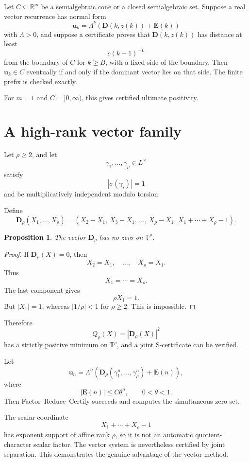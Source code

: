 \documentclass[11pt]{article}
\newtheorem{proposition}[theorem]{Proposition}
\newcommand{\T}{\mathbb T}
\newcommand{\R}{\mathbb R}
\begin{document}
Let \(C\subseteq\R^m\) be a semialgebraic cone or a closed semialgebraic set. Suppose a real vector recurrence has normal form
\[
\mathbf u_k=\Lambda^k(\mathbf D(k,z(k))+\mathbf E(k))
\]
with \(\Lambda>0\), and suppose a certificate proves that \(\mathbf D(k,z(k))\) has distance at least
\[
c(k+1)^{-L}
\]
from the boundary of \(C\) for \(k\ge B\), with a fixed side of the boundary. Then \(\mathbf u_k\in C\) eventually if and only if the dominant vector lies on that side. The finite prefix is checked exactly.

For \(m=1\) and \(C=[0,\infty)\), this gives certified ultimate positivity.

\section{A high-rank vector family}

Let \(\rho\ge2\), and let
\[
\gamma_1,\ldots,\gamma_\rho\in L^\times
\]
satisfy
\[
|\sigma(\gamma_i)|=1
\]
and be multiplicatively independent modulo torsion.

Define
\[
\mathbf D_\rho(X_1,\ldots,X_\rho)
=
\left(
X_2-X_1,\,
X_3-X_1,\,
\ldots,\,
X_\rho-X_1,\,
X_1+\cdots+X_\rho-1
\right).
\]

\begin{proposition}
The vector \(\mathbf D_\rho\) has no zero on \(\T^\rho\).
\end{proposition}

\begin{proof}
If \(\mathbf D_\rho(X)=0\), then
\[
X_2=X_1,\quad \ldots,\quad X_\rho=X_1.
\]
Thus
\[
X_1=\cdots=X_\rho.
\]
The last component gives
\[
\rho X_1=1.
\]
But \(|X_1|=1\), whereas \(|1/\rho|<1\) for \(\rho\ge2\). This is impossible.
\end{proof}

Therefore
\[
Q_\rho(X)=|\mathbf D_\rho(X)|^2
\]
has a strictly positive minimum on \(\T^\rho\), and a joint S-certificate can be verified.

Let
\[
\mathbf u_n
=
\Lambda^n\left(\mathbf D_\rho(\gamma_1^n,\ldots,\gamma_\rho^n)+\mathbf E(n)\right),
\]
where
\[
|\mathbf E(n)|\le C\theta^n,
\qquad
0<\theta<1.
\]
Then Factor--Reduce--Certify succeeds and computes the simultaneous zero set.

The scalar coordinate
\[
X_1+\cdots+X_\rho-1
\]
has exponent support of affine rank \(\rho\), so it is not an automatic quotient-character scalar factor. The vector system is nevertheless certified by joint separation. This demonstrates the genuine advantage of the vector method.
\end{document}

